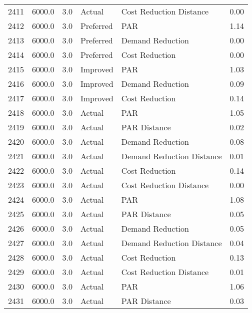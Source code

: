 \begin{longtable}{lrrllr}
2411 &       6000.0 &     3.0 &         Actual &    Cost Reduction Distance &   0.00 \\
2412 &       6000.0 &     3.0 &      Preferred &                        PAR &   1.14 \\
2413 &       6000.0 &     3.0 &      Preferred &           Demand Reduction &   0.00 \\
2414 &       6000.0 &     3.0 &      Preferred &             Cost Reduction &   0.00 \\
2415 &       6000.0 &     3.0 &       Improved &                        PAR &   1.03 \\
2416 &       6000.0 &     3.0 &       Improved &           Demand Reduction &   0.09 \\
2417 &       6000.0 &     3.0 &       Improved &             Cost Reduction &   0.14 \\
2418 &       6000.0 &     3.0 &         Actual &                        PAR &   1.05 \\
2419 &       6000.0 &     3.0 &         Actual &               PAR Distance &   0.02 \\
2420 &       6000.0 &     3.0 &         Actual &           Demand Reduction &   0.08 \\
2421 &       6000.0 &     3.0 &         Actual &  Demand Reduction Distance &   0.01 \\
2422 &       6000.0 &     3.0 &         Actual &             Cost Reduction &   0.14 \\
2423 &       6000.0 &     3.0 &         Actual &    Cost Reduction Distance &   0.00 \\
2424 &       6000.0 &     3.0 &         Actual &                        PAR &   1.08 \\
2425 &       6000.0 &     3.0 &         Actual &               PAR Distance &   0.05 \\
2426 &       6000.0 &     3.0 &         Actual &           Demand Reduction &   0.05 \\
2427 &       6000.0 &     3.0 &         Actual &  Demand Reduction Distance &   0.04 \\
2428 &       6000.0 &     3.0 &         Actual &             Cost Reduction &   0.13 \\
2429 &       6000.0 &     3.0 &         Actual &    Cost Reduction Distance &   0.01 \\
2430 &       6000.0 &     3.0 &         Actual &                        PAR &   1.06 \\
2431 &       6000.0 &     3.0 &         Actual &               PAR Distance &   0.03 \\

\end{longtable}
